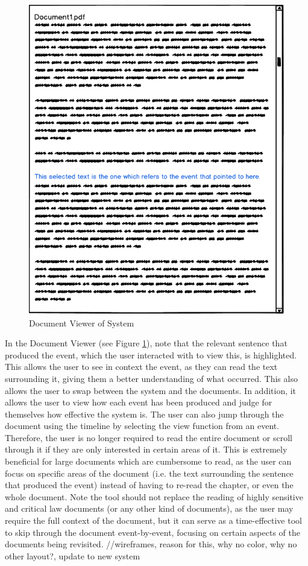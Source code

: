 \begin{figure}[h]
\caption{Document Viewer of System}
\label{fig:viewDoc}
\includegraphics[scale=0.75]{viewDoc.png}
\centering
\end{figure}
\par In the Document Viewer (see Figure \ref{fig:viewDoc}), note that the relevant sentence that produced the event, which the user interacted with to view this, is highlighted. This allows the user to see in context the event, as they can read the text surrounding it, giving them a better understanding of what occurred. This also allows the user to swap between the system and the documents. In addition, it allows the user to view how each event has been produced and judge for themselves how effective the system is. The user can also jump through the document using the timeline by selecting the view function from an event. Therefore, the user is no longer required to read the entire document or scroll through it if they are only interested in certain areas of it. This is extremely beneficial for large documents which are cumbersome to read, as the user can focus on specific areas of the document (i.e. the text surrounding the sentence that produced the event) instead of having to re-read the chapter, or even the whole document. Note the tool should not replace the reading of highly sensitive and critical law documents (or any other kind of documents), as the user may require the full context of the document, but it can serve as a time-effective tool to skip through the document event-by-event, focusing on certain aspects of the documents being revisited.
//wireframes, reason for this, why no color, why no other layout?, update to new system










